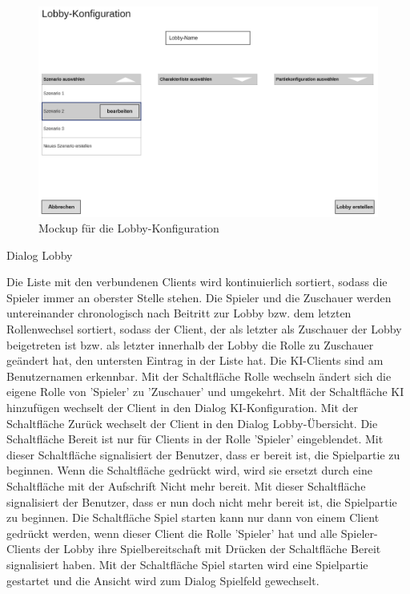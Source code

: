 \begin{figure}
  \centering
  \includegraphics[width=\textwidth]{Meilenstein03/Lobby-Konfiguration_Mockup.png}
  \caption{Mockup für die Lobby-Konfiguration}
\end{figure}

Dialog \glqq{}Lobby\grqq{}

Die Liste mit den verbundenen Clients wird kontinuierlich sortiert, sodass die Spieler immer an oberster Stelle stehen. Die Spieler und die Zuschauer werden untereinander chronologisch nach Beitritt zur Lobby bzw. dem letzten Rollenwechsel sortiert, sodass der Client, der als letzter als Zuschauer der Lobby beigetreten ist bzw. als letzter innerhalb der Lobby die Rolle zu Zuschauer geändert hat, den untersten Eintrag in der Liste hat. Die KI-Clients sind am Benutzernamen erkennbar. 
Mit der Schaltfläche \glqq{}Rolle wechseln\grqq{} ändert sich die eigene Rolle von 'Spieler' zu 'Zuschauer' und umgekehrt. 
Mit der Schaltfläche \glqq{}KI hinzufügen\grqq{} wechselt der Client in den Dialog \glqq{}KI-Konfiguration\grqq{}.
Mit der Schaltfläche \glqq{}Zurück\grqq{} wechselt der Client in den Dialog \glqq{}Lobby-Übersicht\grqq{}.
Die Schaltfläche \glqq{}Bereit\grqq{} ist nur für Clients in der Rolle 'Spieler' eingeblendet. Mit dieser Schaltfläche signalisiert der Benutzer, dass er bereit ist, die Spielpartie zu beginnen. Wenn die Schaltfläche gedrückt wird, wird sie ersetzt durch eine Schaltfläche mit der Aufschrift \glqq{}Nicht mehr bereit\grqq{}. Mit dieser Schaltfläche signalisiert der Benutzer, dass er nun doch nicht mehr bereit ist, die Spielpartie zu beginnen. Die Schaltfläche \glqq{}Spiel starten\grqq{} kann nur dann von einem Client gedrückt werden, wenn dieser Client die Rolle 'Spieler' hat und alle Spieler-Clients der Lobby ihre Spielbereitschaft mit Drücken der Schaltfläche \glqq{}Bereit\grqq{} signalisiert haben.
Mit der Schaltfläche \glqq{}Spiel starten\grqq{} wird eine Spielpartie gestartet und die Ansicht wird zum Dialog \glqq{}Spielfeld\grqq{} gewechselt.

